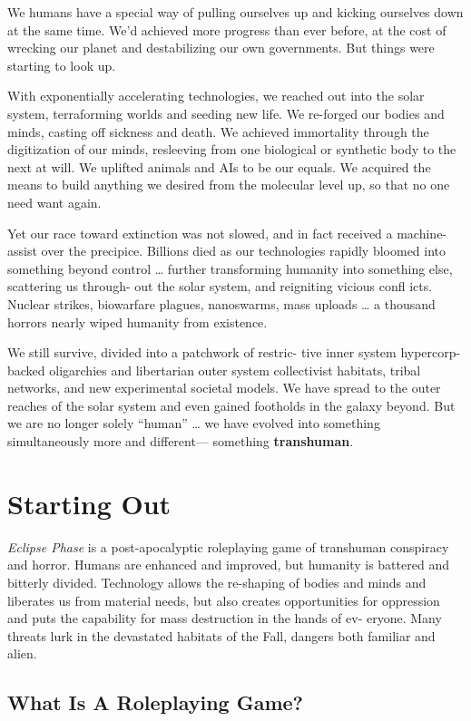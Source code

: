 We humans have a special way of pulling ourselves up 
and kicking ourselves down at the same time. We'd 
achieved more progress than ever before, at the cost 
of wrecking our planet and destabilizing our own 
governments. But things were starting to look up.

With exponentially accelerating technologies, we 
reached out into the solar system, terraforming worlds 
and seeding new life. We re-forged our bodies and 
minds, casting off sickness and death. We achieved 
immortality through the digitization of our minds, 
resleeving from one biological or synthetic body to 
the next at will. We uplifted animals and AIs to be our 
equals. We acquired the means to build anything we 
desired from the molecular level up, so that no one 
need want again.

Yet our race toward extinction was not slowed, and 
in fact received a machine-assist over the precipice. 
Billions died as our technologies rapidly bloomed into 
something beyond control … further transforming 
humanity into something else, scattering us through-
out the solar system, and reigniting vicious confl icts. 
Nuclear strikes, biowarfare plagues, nanoswarms, 
mass uploads … a thousand horrors nearly wiped 
humanity from existence.

We still survive, divided into a patchwork of restric-
tive inner system hypercorp-backed oligarchies and 
libertarian outer system collectivist habitats, tribal 
networks, and new experimental societal models. We 
have spread to the outer reaches of the solar system 
and even gained footholds in the galaxy beyond. But 
we are no longer solely ``human'' … we have evolved 
into something simultaneously more and different—
something \textbf{transhuman}.

\section{Starting Out}

\textit{Eclipse Phase} is a post-apocalyptic roleplaying game 
of transhuman conspiracy and horror. Humans are 
enhanced and improved, but humanity is battered and 
bitterly divided. Technology allows the re-shaping of 
bodies and minds and liberates us from material needs, 
but also creates opportunities for oppression and puts 
the capability for mass destruction in the hands of ev-
eryone. Many threats lurk in the devastated habitats of 
the Fall, dangers both familiar and alien.

\subsection{What Is A Roleplaying Game?}

